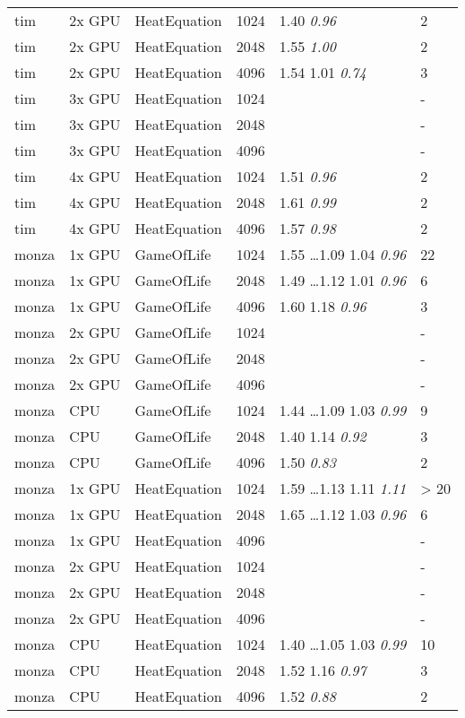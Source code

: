 \begin{tabular}{| l | l | l | l | l | l |}
tim & 2x GPU & HeatEquation & 1024 & 1.40 \textit{0.96} & 2 \\
tim & 2x GPU & HeatEquation & 2048 & 1.55 \textit{1.00} & 2 \\
tim & 2x GPU & HeatEquation & 4096 & 1.54 1.01 \textit{0.74} & 3 \\
tim & 3x GPU & HeatEquation & 1024 &  & - \\
tim & 3x GPU & HeatEquation & 2048 &  & - \\
tim & 3x GPU & HeatEquation & 4096 &  & - \\
tim & 4x GPU & HeatEquation & 1024 & 1.51 \textit{0.96} & 2 \\
tim & 4x GPU & HeatEquation & 2048 & 1.61 \textit{0.99} & 2 \\
tim & 4x GPU & HeatEquation & 4096 & 1.57 \textit{0.98} & 2 \\
monza & 1x GPU & GameOfLife & 1024 & 1.55 \ldots 1.09 1.04 \textit{0.96} & 22 \\
monza & 1x GPU & GameOfLife & 2048 & 1.49 \ldots 1.12 1.01 \textit{0.96} & 6 \\
monza & 1x GPU & GameOfLife & 4096 & 1.60 1.18 \textit{0.96} & 3 \\
monza & 2x GPU & GameOfLife & 1024 &  & - \\
monza & 2x GPU & GameOfLife & 2048 &  & - \\
monza & 2x GPU & GameOfLife & 4096 &  & - \\
monza & CPU & GameOfLife & 1024 & 1.44 \ldots 1.09 1.03 \textit{0.99} & 9 \\
monza & CPU & GameOfLife & 2048 & 1.40 1.14 \textit{0.92} & 3 \\
monza & CPU & GameOfLife & 4096 & 1.50 \textit{0.83} & 2 \\
monza & 1x GPU & HeatEquation & 1024 & 1.59 \ldots 1.13 1.11 \textit{1.11} & > 20 \\
monza & 1x GPU & HeatEquation & 2048 & 1.65 \ldots 1.12 1.03 \textit{0.96} & 6 \\
monza & 1x GPU & HeatEquation & 4096 &  & - \\
monza & 2x GPU & HeatEquation & 1024 &  & - \\
monza & 2x GPU & HeatEquation & 2048 &  & - \\
monza & 2x GPU & HeatEquation & 4096 &  & - \\
monza & CPU & HeatEquation & 1024 & 1.40 \ldots 1.05 1.03 \textit{0.99} & 10 \\
monza & CPU & HeatEquation & 2048 & 1.52 1.16 \textit{0.97} & 3 \\
monza & CPU & HeatEquation & 4096 & 1.52 \textit{0.88} & 2 \\
\hline
\end{tabular}
